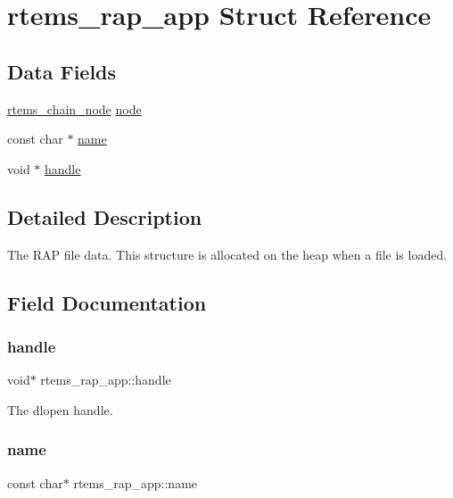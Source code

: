 \hypertarget{structrtems__rap__app}{}\section{rtems\+\_\+rap\+\_\+app Struct Reference}
\label{structrtems__rap__app}
\subsection*{Data Fields}
\begin{DoxyCompactItemize}
\item 
\mbox{\hyperlink{structChain__Node__struct}{rtems\+\_\+chain\+\_\+node}} \mbox{\hyperlink{structrtems__rap__app_a10111874ef249901072c2133cc2029bd}{node}}
\item 
const char $\ast$ \mbox{\hyperlink{structrtems__rap__app_aebb48001df31a3c9fe8b1783815b21ba}{name}}
\item 
void $\ast$ \mbox{\hyperlink{structrtems__rap__app_a20b49870e80afe1cce7a683ba8f14348}{handle}}
\end{DoxyCompactItemize}


\subsection{Detailed Description}
The R\+AP file data. This structure is allocated on the heap when a file is loaded. 

\subsection{Field Documentation}
\mbox{\label{structrtems__rap__app_a20b49870e80afe1cce7a683ba8f14348}} 
\subsubsection{\texorpdfstring{handle}{handle}}
{\footnotesize\ttfamily void$\ast$ rtems\+\_\+rap\+\_\+app\+::handle}

The dlopen handle. \mbox{\label{structrtems__rap__app_aebb48001df31a3c9fe8b1783815b21ba}} 
\subsubsection{\texorpdfstring{name}{name}}
{\footnotesize\ttfamily const char$\ast$ rtems\+\_\+rap\+\_\+app\+::name}


